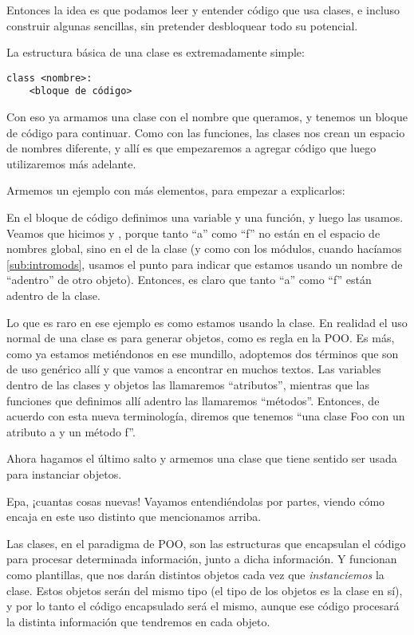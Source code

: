 Entonces la idea es que podamos leer y entender código que usa clases, e incluso construir algunas sencillas, sin pretender desbloquear todo su potencial.

La estructura básica de una clase es extremadamente simple:

\begin{verbatim}
class <nombre>:
    <bloque de código>
\end{verbatim}

Con eso ya armamos una clase con el nombre que queramos, y tenemos un bloque de código para continuar. Como con las funciones, las clases nos crean un espacio de nombres diferente, y allí es que empezaremos a agregar código que luego utilizaremos más adelante.

Armemos un ejemplo con más elementos, para empezar a explicarlos:


En el bloque de código definimos una variable y una función, y luego las usamos. Veamos que hicimos  y , porque tanto ``a'' como ``f'' no están en el espacio de nombres global, sino en el de la clase (y como con los módulos, cuando hacíamos  \ref{sub:intromods}, usamos el punto para indicar que estamos usando un nombre de ``adentro'' de otro objeto). Entonces, es claro que tanto ``a'' como ``f'' están adentro de la clase. 

Lo que es raro en ese ejemplo es como estamos usando la clase. En realidad el uso normal de una clase es para generar objetos, como es regla en la POO. Es más, como ya estamos metiéndonos en ese mundillo, adoptemos dos términos que son de uso genérico allí y que vamos a encontrar en muchos textos. Las variables dentro de las clases y objetos las llamaremos ``atributos'', mientras que las funciones que definimos allí adentro las llamaremos ``métodos''. Entonces, de acuerdo con esta nueva terminología, diremos que tenemos ``una clase Foo con un atributo a y un método f''.

Ahora hagamos el último salto y armemos una clase que tiene sentido ser usada para instanciar objetos.


Epa, ¡cuantas cosas nuevas! Vayamos entendiéndolas por partes, viendo cómo encaja en este uso distinto que mencionamos arriba. 

Las clases, en el paradigma de POO, son las estructuras que encapsulan el código para procesar determinada información, junto a dicha información. Y funcionan como plantillas, que nos darán distintos objetos cada vez que \textit{instanciemos} la clase. Estos objetos serán del mismo tipo (el tipo de los objetos es la clase en sí), y por lo tanto el código encapsulado será el mismo, aunque ese código procesará la distinta información que tendremos en cada objeto.

